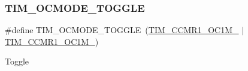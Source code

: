 \subsubsection{\texorpdfstring{T\+I\+M\+\_\+\+O\+C\+M\+O\+D\+E\+\_\+\+T\+O\+G\+G\+LE}{TIM\_OCMODE\_TOGGLE}}
{\footnotesize\ttfamily \#define T\+I\+M\+\_\+\+O\+C\+M\+O\+D\+E\+\_\+\+T\+O\+G\+G\+LE~(\hyperlink{group___peripheral___registers___bits___definition_ga8b5f6ec25063483641d6dc065d96d2b5}{T\+I\+M\+\_\+\+C\+C\+M\+R1\+\_\+\+O\+C1\+M\+\_} $\vert$ \hyperlink{group___peripheral___registers___bits___definition_ga410a4752a98081bad8ab3f72b28e7c5f}{T\+I\+M\+\_\+\+C\+C\+M\+R1\+\_\+\+O\+C1\+M\+\_})}

Toggle 